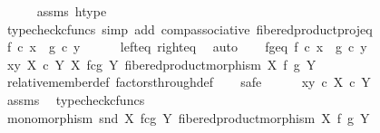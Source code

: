 \begin{isabellebody}
\ \ \ \ \isamarkupfalse%
\ assms\ h{\isacharunderscore}{\kern0pt}type\ \isamarkupfalse%
\ {\isacharparenleft}{\kern0pt}typecheck{\isacharunderscore}{\kern0pt}cfuncs{\isacharcomma}{\kern0pt}\ simp\ add{\isacharcolon}{\kern0pt}\ comp{\isacharunderscore}{\kern0pt}associative{}\ fibered{\isacharunderscore}{\kern0pt}product{\isacharunderscore}{\kern0pt}proj{\isacharunderscore}{\kern0pt}eq{\isacharparenright}{\kern0pt}\isanewline
\ \ \isamarkupfalse%
\ \isamarkupfalse%
\ {\isachardoublequoteopen}f\ {\isasymcirc}\isactrlsub c\ x\ {\isacharequal}{\kern0pt}\ g\ {\isasymcirc}\isactrlsub c\ y{\isachardoublequoteclose}\isanewline
\ \ \ \ \isamarkupfalse%
\ left{\isacharunderscore}{\kern0pt}eq\ right{\isacharunderscore}{\kern0pt}eq\ \isamarkupfalse%
\ auto\isanewline
{}\isamarkupfalse%
\isanewline
\ \ \isamarkupfalse%
\ f{\isacharunderscore}{\kern0pt}g{\isacharunderscore}{\kern0pt}eq{\isacharcolon}{\kern0pt}\ {\isachardoublequoteopen}f\ {\isasymcirc}\isactrlsub c\ x\ {\isacharequal}{\kern0pt}\ g\ {\isasymcirc}\isactrlsub c\ y{\isachardoublequoteclose}\isanewline
\ \ \isamarkupfalse%
\ {\isachardoublequoteopen}{\isasymlangle}x{\isacharcomma}{\kern0pt}y{\isasymrangle}\ {\isasymin}\isactrlbsub X\ {\isasymtimes}\isactrlsub c\ Y\isactrlesub \ {\isacharparenleft}{\kern0pt}X\ \isactrlbsub f\isactrlesub {\isasymtimes}\isactrlsub c\isactrlbsub g\isactrlesub \ Y{\isacharcomma}{\kern0pt}\ fibered{\isacharunderscore}{\kern0pt}product{\isacharunderscore}{\kern0pt}morphism\ X\ f\ g\ Y{\isacharparenright}{\kern0pt}{\isachardoublequoteclose}\isanewline
\ \ \ \ \isamarkupfalse%
\ relative{\isacharunderscore}{\kern0pt}member{\isacharunderscore}{\kern0pt}def\ factors{\isacharunderscore}{\kern0pt}through{\isacharunderscore}{\kern0pt}def\isanewline
\ \ \isamarkupfalse%
\ {\isacharparenleft}{\kern0pt}safe{\isacharparenright}{\kern0pt}\isanewline
\ \ \ \ \isamarkupfalse%
\ {\isachardoublequoteopen}{\isasymlangle}x{\isacharcomma}{\kern0pt}y{\isasymrangle}\ {\isasymin}\isactrlsub c\ X\ {\isasymtimes}\isactrlsub c\ Y{\isachardoublequoteclose}\isanewline
\ \ \ \ \ \ \isamarkupfalse%
\ assms\ \isamarkupfalse%
\ typecheck{\isacharunderscore}{\kern0pt}cfuncs\isanewline
\ \ \ \ \isamarkupfalse%
\ {\isachardoublequoteopen}monomorphism\ {\isacharparenleft}{\kern0pt}snd\ {\isacharparenleft}{\kern0pt}X\ \isactrlbsub f\isactrlesub {\isasymtimes}\isactrlsub c\isactrlbsub g\isactrlesub \ Y{\isacharcomma}{\kern0pt}\ fibered{\isacharunderscore}{\kern0pt}product{\isacharunderscore}{\kern0pt}morphism\ X\ f\ g\ Y{\isacharparenright}{\kern0pt}{\isacharparenright}{\kern0pt}{\isachardoublequoteclose}\isanewline

\end{isabellebody}
